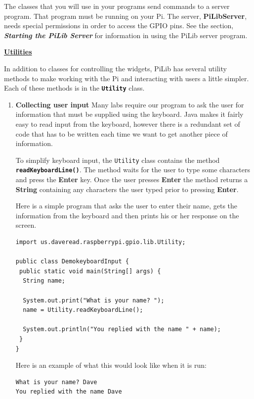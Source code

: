 The classes that you will use in your programs send commands to a server program. That program must be running on your Pi. The server, \textbf{PiLibServer}, needs special permissions in order to access the GPIO pins. See the section, \textbf{\textit{Starting the PiLib Server}} for information in using the PiLib server program.

\textbf{\underline{Utilities}} \newline

In addition to classes for controlling the widgets, PiLib has several utility methods to make working with the Pi and interacting with users a little simpler. Each of these methods is in the \textbf{\texttt{Utility}} class.

\begin{enumerate}
	\item \textbf{Collecting user input} \newline
	Many labs require our program to ask the user for information that must be supplied using the keyboard. Java makes it fairly easy to read input from the keyboard, however there is a redundant set of code that has to be written each time we want to get another piece of information.
	
	To simplify keyboard input, the \texttt{Utility} class contains the method \textbf{\texttt{readKeyboardLine()}}. The method waits for the user to type some characters and press the \textbf{Enter} key. Once the user presses \textbf{Enter} the method returns a \textbf{String} containing any characters the user typed prior to pressing \textbf{Enter}.
	
	Here is a simple program that asks the user to enter their name, gets the information from the keyboard and then prints his or her response on the screen.
	
\beforeverb
\begin{verbatim}
import us.daveread.raspberrypi.gpio.lib.Utility;

public class DemokeyboardInput {
 public static void main(String[] args) {
  String name;

  System.out.print("What is your name? ");
  name = Utility.readKeyboardLine();

  System.out.println("You replied with the name " + name);
 }
}\end{verbatim}
\afterverb

Here is an example of what this would look like when it is run:

\beforeverb
\begin{verbatim}
What is your name? Dave
You replied with the name Dave
\end{verbatim}
\afterverb



\end{enumerate}
